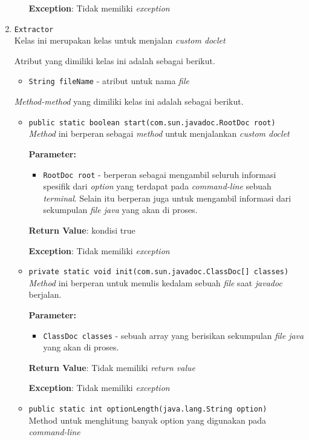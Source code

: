 \begin{enumerate}
\begin{itemize}
\textbf{Exception}: Tidak memiliki \textit{exception}

\end{itemize}
\item \texttt{Extractor}\\Kelas ini merupakan kelas untuk menjalan \textit{custom doclet}

Atribut yang dimiliki kelas ini adalah sebagai berikut.
\begin{itemize}
\item \texttt{String fileName} - atribut untuk nama \textit{file}
\end{itemize}
\textit{Method-method} yang dimiliki kelas ini adalah sebagai berikut.
\begin{itemize}
\item \texttt{public static boolean start(com.sun.javadoc.RootDoc root)}\\ 
\textit{Method} ini berperan sebagai \textit{method} untuk menjalankan
 \textit{custom doclet}

\textbf{Parameter:}
\begin{itemize}
\item \texttt{RootDoc root} - 
berperan sebagai mengambil seluruh informasi spesifik dari
             \textit{option} yang terdapat pada \textit{command-line} sebuah
             \textit{terminal}. Selain itu berperan juga untuk mengambil informasi dari
             sekumpulan \textit{file java} yang akan di proses.
\end{itemize}
\textbf{Return Value}: kondisi true

\textbf{Exception}: Tidak memiliki \textit{exception}

\item \texttt{private static void init(com.sun.javadoc.ClassDoc[] classes)}\\ 
\textit{Method} ini berperan untuk menulis kedalam sebuah \textit{file}
 saat \textit{javadoc} berjalan.

\textbf{Parameter:}
\begin{itemize}
\item \texttt{ClassDoc classes} - 
sebuah array yang berisikan sekumpulan \textit{file java}
                yang akan di proses.
\end{itemize}
\textbf{Return Value}: Tidak memiliki \textit{return value}

\textbf{Exception}: Tidak memiliki \textit{exception}

\item \texttt{public static int optionLength(java.lang.String option)}\\ 
Method untuk menghitung banyak option yang digunakan pada
 \textit{command-line}


\end{itemize}
\end{enumerate}
